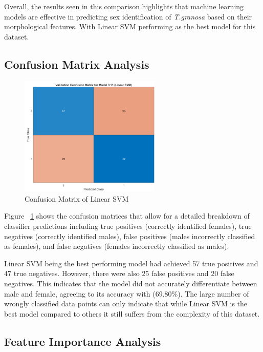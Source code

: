 Overall, the results seen in this comparison highlights that machine learning models are effective in predicting sex identification of \textit{T.granosa} based on their morphological features. With Linear SVM performing as the best model for this dataset. 


\subsection{Confusion Matrix Analysis}
\begin{figure}[!htbp]
	\centering
	\includegraphics[width=0.6\textwidth]{figures/confusion-matrix.png}
	\caption{Confusion Matrix of Linear SVM}
	\label{fig:confusion-matrix}
\end{figure}

Figure ~\ref{fig:confusion-matrix} shows the confusion matrices that allow for a detailed breakdown of classifier predictions including true positives (correctly identified females), true negatives (correctly identified males), false positives (males incorrectly classified as females), and false negatives (females incorrectly classified as males).

Linear SVM being the best performing model had achieved 57 true positives and 47 true negatives. However, there were also 25 false positives and 20 false negatives. This indicates that the model did not accurately differentiate  between male and female, agreeing to its accuracy with (69.80\%). The large number of wrongly classified data points can only indicate that while Linear SVM is the best model compared to others it still suffers from the complexity of this dataset. 


\subsection{Feature Importance Analysis}

